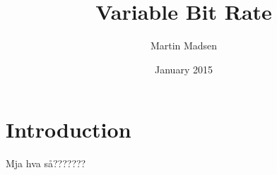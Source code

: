 \documentclass{article}
\title{Variable Bit Rate}
\author{Martin Madsen}
\date{January 2015}
\begin{document}
\maketitle

\section{Introduction}
Mja hva så???????
\end{document}
